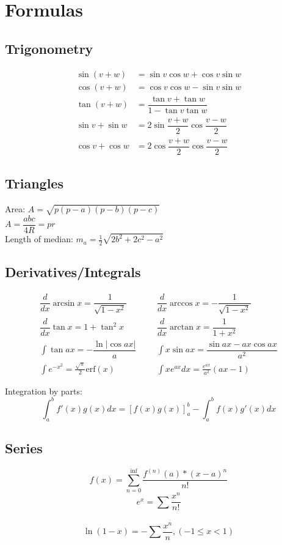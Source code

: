 \chapter{Formulas}

\section{Trigonometry}
\begin{align*}
\sin(v+w)&{}=\sin v\cos w+\cos v\sin w\\
\cos(v+w)&{}=\cos v\cos w-\sin v\sin w\\
\tan(v+w)&{}=\dfrac{\tan v+\tan w}{1-\tan v\tan w}\\
\sin v+\sin w&{}=2\sin\dfrac{v+w}{2}\cos\dfrac{v-w}{2}\\
\cos v+\cos w&{}=2\cos\dfrac{v+w}{2}\cos\dfrac{v-w}{2}
\end{align*}

\section{Triangles}
Area: $A=\sqrt{p(p-a)(p-b)(p-c)}$\\
$A=\dfrac{abc}{4R} = pr$\\
Length of median: $m_a=\tfrac{1}{2}\sqrt{2b^2+2c^2-a^2}$\\

\section{Derivatives/Integrals}
\begin{align*}
	\dfrac{d}{dx}\arcsin x = \dfrac{1}{\sqrt{1-x^2}} &&& \dfrac{d}{dx}\arccos x = -\dfrac{1}{\sqrt{1-x^2}} \\
	\dfrac{d}{dx}\tan x = 1+\tan^2 x &&& \dfrac{d}{dx}\arctan x = \dfrac{1}{1+x^2} \\
	\int\tan ax = -\dfrac{\ln|\cos ax|}{a} &&& \int x\sin ax = \dfrac{\sin ax-ax \cos ax}{a^2} \\
	\int e^{-x^2} = \frac{\sqrt \pi}{2} \text{erf}(x) &&& \int xe^{ax}dx = \frac{e^{ax}}{a^2}(ax-1)
\end{align*}

Integration by parts:
\[\int_a^bf'(x)g(x)dx = [f(x)g(x)]_a^b-\int_a^bf(x)g'(x)dx\]

\section{Series}
$$f(x) = \sum_{n = 0}^{\inf} \frac{f^{(n)}(a) * (x - a)^n}{n!}$$
$$e^x = \sum \frac{x^n}{n!}$$\\  
$$\ln(1-x) = -\sum \frac{x^n}{n},(-1\leq x <1)$$

